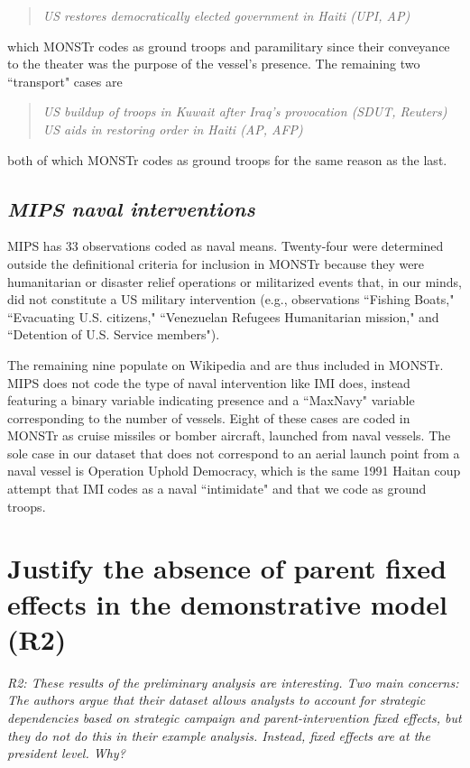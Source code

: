 \documentclass[fleqn,12pt]{article}
\begin{document}
\begin{quote}
    \textit{US restores democratically elected government in Haiti (UPI, AP)}
\end{quote}

\noindent
which MONSTr codes as ground troops and paramilitary since their conveyance to the theater was the purpose of the vessel's presence. The remaining two ``transport" cases are 

\begin{quote}
    \textit{US buildup of troops in Kuwait after Iraq's provocation (SDUT, Reuters) \\
    US aids in restoring order in Haiti (AP, AFP)}
\end{quote}

\noindent
both of which MONSTr codes as ground troops for the same reason as the last.

\subsection*{\textit{MIPS naval interventions}}
MIPS has 33 observations coded as naval means. Twenty-four were determined outside the definitional criteria for inclusion in MONSTr because they were humanitarian or disaster relief operations or militarized events that, in our minds, did not constitute a US military intervention (e.g., observations ``Fishing Boats," ``Evacuating U.S. citizens," ``Venezuelan Refugees Humanitarian mission," and ``Detention of U.S. Service members").

The remaining nine populate on Wikipedia and are thus included in MONSTr. MIPS does not code the type of naval intervention like IMI does, instead featuring a binary variable indicating presence and a ``MaxNavy" variable corresponding to the number of vessels. Eight of these cases are coded in MONSTr as cruise missiles or bomber aircraft, launched from naval vessels. The sole case in our dataset that does not correspond to an aerial launch point from a naval vessel is Operation Uphold Democracy, which is the same 1991 Haitan coup attempt that IMI codes as a naval ``intimidate" and that we code as ground troops.

\section{Justify the absence of parent fixed effects in the demonstrative model (R2)}
\noindent \textit{R2: These results of the preliminary analysis are interesting. Two main concerns: The authors argue that their dataset allows analysts to account for strategic dependencies based on strategic campaign and parent-intervention fixed effects, but they do not do this in their example analysis. Instead, fixed effects are at the president level. Why?} \\
\end{document}
